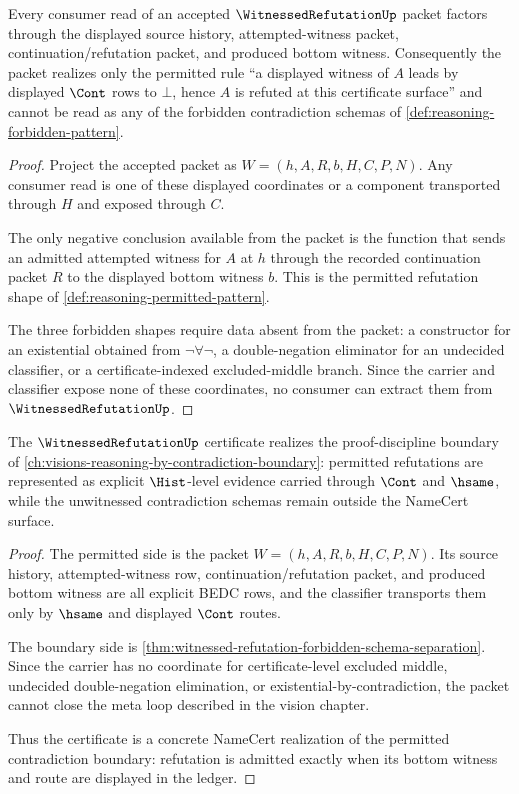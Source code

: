 \begin{theorem}
\label{thm:witnessed-refutation-forbidden-schema-separation}
Every consumer read of an accepted $\WitnessedRefutationUp$ packet factors through the displayed source history, attempted-witness packet, continuation/refutation packet, and produced bottom witness. Consequently the packet realizes only the permitted rule ``a displayed witness of $A$ leads by displayed $\Cont$ rows to $\bot$, hence $A$ is refuted at this certificate surface'' and cannot be read as any of the forbidden contradiction schemas of \autoref{def:reasoning-forbidden-pattern}.
\end{theorem}
\begin{proof}
Project the accepted packet as $W=(h,A,R,b,H,C,P,N)$. Any consumer read is one of these displayed coordinates or a component transported through $H$ and exposed through $C$.

The only negative conclusion available from the packet is the function that sends an admitted attempted witness for $A$ at $h$ through the recorded continuation packet $R$ to the displayed bottom witness $b$. This is the permitted refutation shape of \autoref{def:reasoning-permitted-pattern}.

The three forbidden shapes require data absent from the packet: a constructor for an existential obtained from $\neg\forall\neg$, a double-negation eliminator for an undecided classifier, or a certificate-indexed excluded-middle branch. Since the carrier and classifier expose none of these coordinates, no consumer can extract them from $\WitnessedRefutationUp$.
\end{proof}

\begin{theorem}
\label{thm:witnessed-refutation-vision-concretization}
The $\WitnessedRefutationUp$ certificate realizes the proof-discipline boundary of \autoref{ch:visions-reasoning-by-contradiction-boundary}: permitted refutations are represented as explicit $\Hist$-level evidence carried through $\Cont$ and $\hsame$, while the unwitnessed contradiction schemas remain outside the NameCert surface.
\end{theorem}
\begin{proof}
The permitted side is the packet $W=(h,A,R,b,H,C,P,N)$. Its source history, attempted-witness row, continuation/refutation packet, and produced bottom witness are all explicit BEDC rows, and the classifier transports them only by $\hsame$ and displayed $\Cont$ routes.

The boundary side is \autoref{thm:witnessed-refutation-forbidden-schema-separation}. Since the carrier has no coordinate for certificate-level excluded middle, undecided double-negation elimination, or existential-by-contradiction, the packet cannot close the meta loop described in the vision chapter.

Thus the certificate is a concrete NameCert realization of the permitted contradiction boundary: refutation is admitted exactly when its bottom witness and route are displayed in the ledger.
\end{proof}

